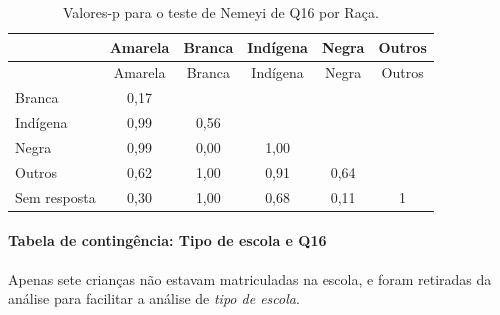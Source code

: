 \documentclass[]{article}
\let\oldparagraph\paragraph
\renewcommand{\paragraph}[1]{\oldparagraph{#1}\mbox{}}
\begin{document}
\begin{longtable}[]{@{}lccccc@{}}
\caption{\label{tab:unnamed-chunk-169}Valores-p para o teste de Nemeyi de Q16 por Raça.}\tabularnewline
\toprule
& Amarela & Branca & Indígena & Negra & Outros\tabularnewline
\midrule
\endfirsthead
\toprule
& Amarela & Branca & Indígena & Negra & Outros\tabularnewline
\midrule
\endhead
Branca & 0,17 & & & &\tabularnewline
Indígena & 0,99 & 0,56 & & &\tabularnewline
Negra & 0,99 & 0,00 & 1,00 & &\tabularnewline
Outros & 0,62 & 1,00 & 0,91 & 0,64 &\tabularnewline
Sem resposta & 0,30 & 1,00 & 0,68 & 0,11 & 1\tabularnewline
\bottomrule
\end{longtable}

\cleardoublepage

\hypertarget{tabela-de-continguxeancia-tipo-de-escola-e-q16}{%
\paragraph{Tabela de contingência: Tipo de escola e Q16}\label{tabela-de-continguxeancia-tipo-de-escola-e-q16}}

Apenas sete crianças não estavam matriculadas na escola, e foram retiradas da análise para facilitar a análise de \emph{tipo de escola}.
\end{document}
